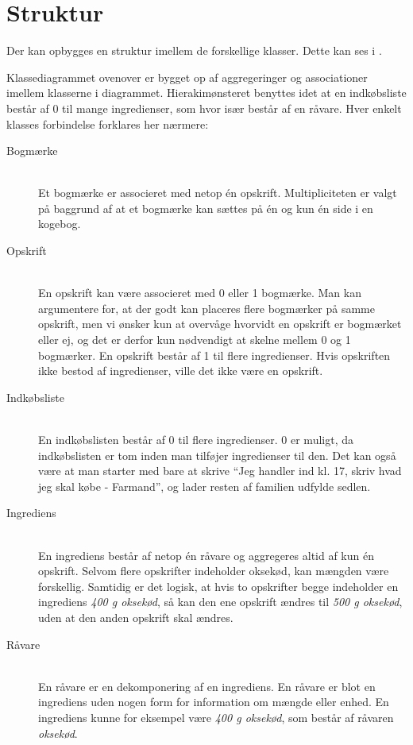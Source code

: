 \section{Struktur}
\label{sec:struktur}

Der kan opbygges en struktur imellem de forskellige klasser. Dette kan ses i . 



Klassediagrammet ovenover er bygget op af aggregeringer og associationer imellem klasserne i diagrammet. Hierakimønsteret benyttes idet at en indkøbsliste består af 0 til mange ingredienser, som hvor især består af en råvare. Hver enkelt klasses forbindelse forklares her nærmere:

\begin{description}
  \item[Bogmærke] \hfill \\
    Et bogmærke er associeret med netop én opskrift. Multipliciteten er valgt på baggrund af at et bogmærke kan sættes på én og kun én side i en kogebog.

  \item[Opskrift] \hfill \\
    En opskrift kan være associeret med 0 eller 1 bogmærke. Man kan argumentere for, at der godt kan placeres flere bogmærker på samme opskrift, men vi ønsker kun at overvåge hvorvidt en opskrift er bogmærket eller ej, og det er derfor kun nødvendigt at skelne mellem 0 og 1 bogmærker. En opskrift består af 1 til flere ingredienser. Hvis opskriften ikke bestod af ingredienser, ville det ikke være en opskrift.

\item[Indkøbsliste] \hfill \\
  En indkøbslisten består af 0 til flere ingredienser. 0 er muligt, da indkøbslisten er tom inden man tilføjer ingredienser til den. Det kan også være at man starter med bare at skrive ``Jeg handler ind kl. 17, skriv hvad jeg skal købe - Farmand'', og lader resten af familien udfylde sedlen.

\item[Ingrediens] \hfill \\
  En ingrediens består af netop én råvare og aggregeres altid af kun én opskrift. Selvom flere opskrifter indeholder oksekød, kan mængden være forskellig. Samtidig er det logisk, at hvis to opskrifter begge indeholder en ingrediens \textit{400 g oksekød}, så kan den ene opskrift ændres til \textit{500 g oksekød}, uden at den anden opskrift skal ændres.

\item[Råvare] \hfill \\
  En råvare er en dekomponering af en ingrediens. En råvare er blot en ingrediens uden nogen form for information om mængde eller enhed. En ingrediens kunne for eksempel være \textit{400 g oksekød}, som består af råvaren \textit{oksekød}.
\end{description}

